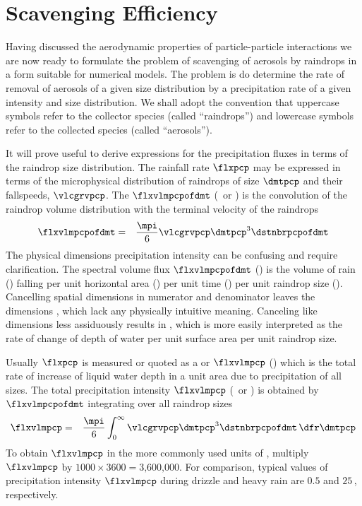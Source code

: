 \documentclass[12pt,twoside]{book}
\begin{document}
\section{Scavenging Efficiency}\label{sxn:scv_fsh}
Having discussed the aerodynamic properties of particle-particle
interactions we are now ready to formulate the problem of scavenging
of aerosols by raindrops in a form suitable for numerical models.
The problem is do determine the rate of removal of aerosols of a given
size distribution by a precipitation rate of a given intensity and
size distribution.
We shall adopt the convention that uppercase symbols refer to the
collector species (called ``raindrops'') and lowercase symbols refer
to the collected species (called ``aerosols'').

It will prove useful to derive expressions for the precipitation
fluxes in terms of the raindrop size distribution.
The rainfall rate $\flxpcp$ may be expressed in terms of the 
microphysical distribution of raindrops of size $\dmtpcp$ and their
fallspeeds, $\vlcgrvpcp$.  
The  $\flxvlmpcpofdmt$ 
(\mCxmSsm\ or \mxsm) is the convolution of the raindrop volume
distribution with the terminal velocity of the raindrops
\begin{eqnarray}
\flxvlmpcpofdmt & = & \frac{\mpi}{6} \vlcgrvpcp \dmtpcp^{3}
\dstnbrpcpofdmt 
\label{eqn:flx_vlm_pcp_spc_dfn}
\end{eqnarray}
The physical dimensions precipitation intensity can be confusing and 
require clarification.
The spectral volume flux $\flxvlmpcpofdmt$ (\mCxmSsm) is the volume of
rain (\mC) falling per unit horizontal area (\xmS) per unit time (\xs)
per unit raindrop size (\xm).  
Cancelling spatial dimensions in numerator and denominator leaves
the dimensions \xs, which lack any physically intuitive meaning.
Canceling like dimensions less assiduously results in \mxsm, which
is more easily interpreted as the rate of change of depth of water per
unit surface area per unit raindrop size.

Usually $\flxpcp$ is measured or quoted as a  or  $\flxvlmpcp$ (\mxs)
which is the total rate of increase of liquid water depth in a unit
area due to precipitation of all sizes.
The total precipitation intensity $\flxvlmpcp$ (\mCxmSs\ or \mxs) is
obtained by $\flxvlmpcpofdmt$ integrating over all raindrop sizes
\begin{eqnarray}
\flxvlmpcp & = & \frac{\mpi}{6}
\int_{0}^{\infty} \vlcgrvpcp \dmtpcp^{3} \dstnbrpcpofdmt \,\dfr\dmtpcp
\label{eqn:flx_vlm_pcp_dfn}
\end{eqnarray}
To obtain $\flxvlmpcp$ in the more commonly used units of \mmxhr,
multiply $\flxvlmpcp$ by $1000 \times 3600 = \mbox{3,600,000}$.
For comparison, typical values of precipitation intensity $\flxvlmpcp$
during drizzle and heavy rain are $0.5$ and $25$\,\mmxhr, respectively.
\end{document}

